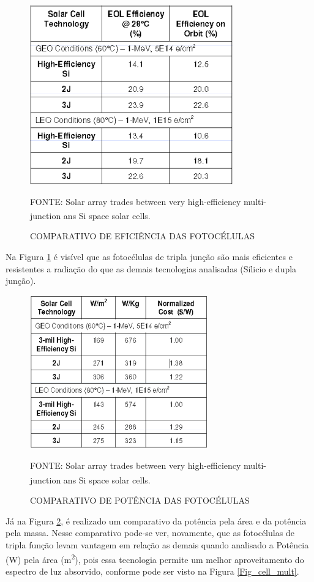 \documentclass[
	12pt,				%
	openright,			%
	oneside,			%
	a4paper,			%
	english,			%
	french,				%
	spanish,			%
	brazil,				%
	oldfontcommands
	]{abntex2}
\begin{document}
	\begin{figure}[th]
		\caption{COMPARATIVO DE EFICIÊNCIA DAS FOTOCÉLULAS}
		\label{Fig_cell_comp1}
		\centering
		\includegraphics[width=0.6\linewidth]{./figs/cell_comp1}
			
		\begin{small}
			FONTE: Solar array trades between very high-efficiency multi-junction ans Si space solar cells.\textsuperscript{\cite{Fatemi}}
		\end{small}		
	\end{figure}
	
	Na Figura \ref{Fig_cell_comp1} é visível que as fotocélulas de tripla junção são mais eficientes e resistentes a radiação do que as demais tecnologias analisadas (Sílicio e dupla junção).
	
	\begin{figure}[th]
		\caption{COMPARATIVO DE POTÊNCIA DAS FOTOCÉLULAS}
		\label{Fig_cell_comp2}
		\centering
		\includegraphics[width=0.6\linewidth]{./figs/cell_comp2}
			
		\begin{small}
			FONTE: Solar array trades between very high-efficiency multi-junction ans Si space solar cells.\textsuperscript{\cite{Fatemi}}
		\end{small}		
	\end{figure}	
	\pagebreak
	Já na Figura \ref{Fig_cell_comp2}, é realizado um comparativo da potência pela área e da potência pela massa. Nesse comparativo pode-se ver, novamente, que as fotocélulas de tripla função levam vantagem em relação as demais quando analisado a Potência (W) pela área (m\textsuperscript{2}), pois essa tecnologia permite um melhor aproveitamento do espectro de luz absorvido, conforme pode ser visto na Figura \ref{Fig_cell_mult}. 
	
\end{document}
